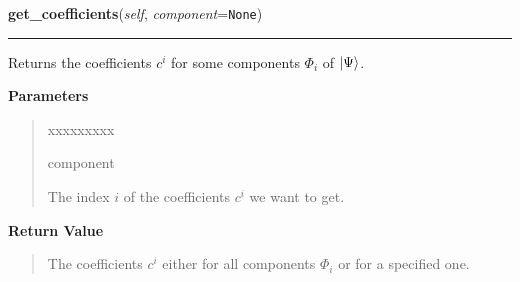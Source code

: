     \label{HagedornMultiWavepacket:HagedornMultiWavepacket:get_coefficients}

    \vspace{0.5ex}

\hspace{.8\funcindent}\begin{boxedminipage}{\funcwidth}

    \raggedright \textbf{get\_coefficients}(\textit{self}, \textit{component}={\tt None})

    \vspace{-1.5ex}

    \rule{\textwidth}{0.5\fboxrule}
\setlength{\parskip}{2ex}
    Returns the coefficients $c^i$ for some components
    $\Phi_i$ of
    $\Ket{\Psi}$.

\setlength{\parskip}{1ex}
      \textbf{Parameters}
      \vspace{-1ex}

      \begin{quote}
        \begin{Ventry}{xxxxxxxxx}

          \item[component]

          The index $i$ of the coefficients $c^i$ we
          want to get.

        \end{Ventry}

      \end{quote}

      \textbf{Return Value}
    \vspace{-1ex}

      \begin{quote}
      The coefficients $c^i$ either for all components
      $\Phi_i$ or for a specified one.

      \end{quote}

    \end{boxedminipage}

    \label{HagedornMultiWavepacket:HagedornMultiWavepacket:get_coefficient_vector}

    \vspace{0.5ex}

